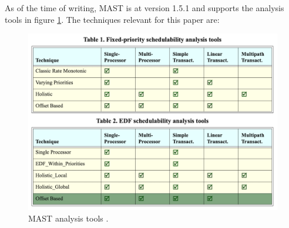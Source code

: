 \documentclass{article}
\begin{document}
As of the time of writing, MAST is at version 1.5.1 and supports the analysis tools \cite{mast-analysis} in figure \ref{mast-analysis-tools}. The techniques relevant for this paper are:

\begin{figure}[!htbp]
\centering
\includegraphics[width=5in]{images/mast-analysis}
\caption{MAST analysis tools \cite{mast-analysis}.}
\label{mast-analysis-tools}
\end{figure}
\end{document}
